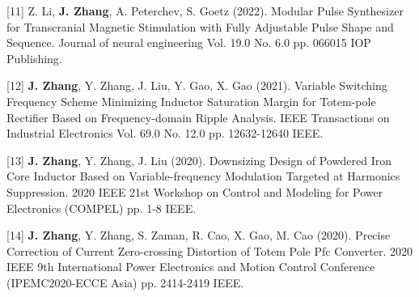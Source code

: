 [11] Z. Li, \textbf{J. Zhang}, A. Peterchev, S. Goetz (2022). Modular Pulse Synthesizer for Transcranial Magnetic Stimulation with Fully Adjustable Pulse Shape and Sequence. Journal of neural engineering Vol. 19.0 No. 6.0 pp. 066015 IOP Publishing.

[12] \textbf{J. Zhang}, Y. Zhang, J. Liu, Y. Gao, X. Gao (2021). Variable Switching Frequency Scheme Minimizing Inductor Saturation Margin for Totem-pole Rectifier Based on Frequency-domain Ripple Analysis. IEEE Transactions on Industrial Electronics Vol. 69.0 No. 12.0 pp. 12632-12640 IEEE.

[13] \textbf{J. Zhang}, Y. Zhang, J. Liu (2020). Downsizing Design of Powdered Iron Core Inductor Based on Variable-frequency Modulation Targeted at Harmonics Suppression. 2020 IEEE 21st Workshop on Control and Modeling for Power Electronics (COMPEL)   pp. 1-8 IEEE.

[14] \textbf{J. Zhang}, Y. Zhang, S. Zaman, R. Cao, X. Gao, M. Cao (2020). Precise Correction of Current Zero-crossing Distortion of Totem Pole Pfc Converter. 2020 IEEE 9th International Power Electronics and Motion Control Conference (IPEMC2020-ECCE Asia)   pp. 2414-2419 IEEE.